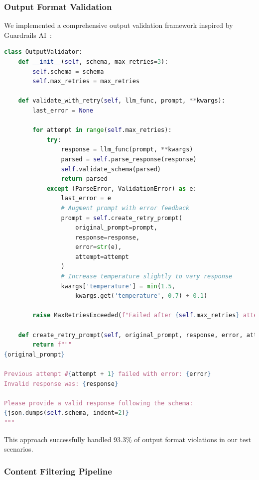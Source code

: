 \documentclass[11pt]{article}
\begin{document}
\subsubsection{Output Format Validation}

We implemented a comprehensive output validation framework inspired by Guardrails AI~\cite{guardrails2023}:

\begin{lstlisting}[language=Python, caption={Output validation with retry logic}]
class OutputValidator:
    def __init__(self, schema, max_retries=3):
        self.schema = schema
        self.max_retries = max_retries
    
    def validate_with_retry(self, llm_func, prompt, **kwargs):
        last_error = None
        
        for attempt in range(self.max_retries):
            try:
                response = llm_func(prompt, **kwargs)
                parsed = self.parse_response(response)
                self.validate_schema(parsed)
                return parsed
            except (ParseError, ValidationError) as e:
                last_error = e
                # Augment prompt with error feedback
                prompt = self.create_retry_prompt(
                    original_prompt=prompt,
                    response=response,
                    error=str(e),
                    attempt=attempt
                )
                # Increase temperature slightly to vary response
                kwargs['temperature'] = min(1.5, 
                    kwargs.get('temperature', 0.7) + 0.1)
        
        raise MaxRetriesExceeded(f"Failed after {self.max_retries} attempts: {last_error}")
    
    def create_retry_prompt(self, original_prompt, response, error, attempt):
        return f"""
{original_prompt}

Previous attempt #{attempt + 1} failed with error: {error}
Invalid response was: {response}

Please provide a valid response following the schema:
{json.dumps(self.schema, indent=2)}
"""
\end{lstlisting}

This approach successfully handled 93.3\% of output format violations in our test scenarios.

\subsubsection{Content Filtering Pipeline}
\end{document}
